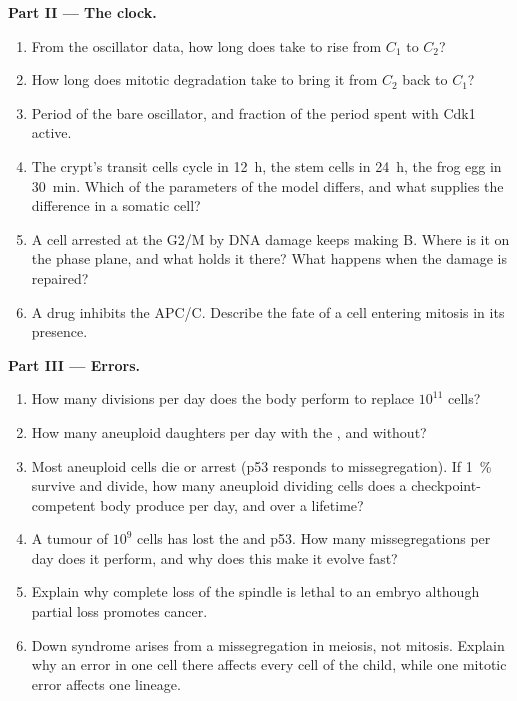 \begin{problem}
\medskip
\noindent\textbf{Part II --- The clock.}
\begin{enumerate}[resume]
  \item From the oscillator data, how long does  take to rise
        from $C_{1}$ to $C_{2}$?
  \item How long does mitotic degradation take to bring it from $C_{2}$
        back to $C_{1}$?
  \item Period of the bare oscillator, and fraction of the period spent
        with Cdk1 active.
  \item The crypt's transit cells cycle in \qty{12}{h}, the stem cells
        in \qty{24}{h}, the frog egg in \qty{30}{min}. Which of the
        parameters of the model differs, and what supplies the
        difference in a somatic cell?
  \item A cell arrested at the G2/M  by DNA damage keeps
        making  B. Where is it on the phase plane, and what holds
        it there? What happens when the damage is repaired?
  \item A drug inhibits the APC/C. Describe the fate of a cell entering
        mitosis in its presence.
\end{enumerate}

\medskip
\noindent\textbf{Part III --- Errors.}
\begin{enumerate}[resume]
  \item How many divisions per day does the body perform to replace
        $10^{11}$ cells?
  \item How many aneuploid daughters per day with the , and
        without?
  \item Most aneuploid cells die or arrest (p53 responds to
        missegregation). If \qty{1}{\%} survive and divide, how many
        aneuploid dividing cells does a checkpoint-competent body
        produce per day, and over a lifetime?
  \item A tumour of $10^{9}$ cells has lost the  and p53.
        How many missegregations per day does it perform, and why does
        this make it evolve fast?
  \item Explain why complete loss of the spindle  is
        lethal to an embryo although partial loss promotes cancer.
  \item Down syndrome arises from a missegregation in meiosis, not
        mitosis. Explain why an error in one cell there affects every
        cell of the child, while one mitotic error affects one lineage.
\end{enumerate}


\end{problem}
